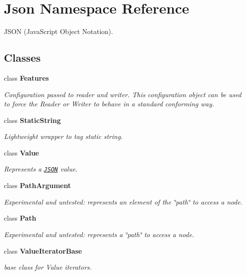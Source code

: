 \hypertarget{namespace_json}{\section{Json Namespace Reference}
\label{namespace_json}
}


J\-S\-O\-N (Java\-Script Object Notation).  


\subsection*{Classes}
\begin{DoxyCompactItemize}
\item 
class {\bfseries Features}
\begin{DoxyCompactList}\small\item\em Configuration passed to reader and writer. This configuration object can be used to force the Reader or Writer to behave in a standard conforming way. \end{DoxyCompactList}\item 
class {\bfseries Static\-String}
\begin{DoxyCompactList}\small\item\em Lightweight wrapper to tag static string. \end{DoxyCompactList}\item 
class {\bfseries Value}
\begin{DoxyCompactList}\small\item\em Represents a \href{http://www.json.org}{\tt J\-S\-O\-N} value. \end{DoxyCompactList}\item 
class {\bfseries Path\-Argument}
\begin{DoxyCompactList}\small\item\em Experimental and untested\-: represents an element of the \char`\"{}path\char`\"{} to access a node. \end{DoxyCompactList}\item 
class {\bfseries Path}
\begin{DoxyCompactList}\small\item\em Experimental and untested\-: represents a \char`\"{}path\char`\"{} to access a node. \end{DoxyCompactList}\item 
class {\bfseries Value\-Iterator\-Base}
\begin{DoxyCompactList}\small\item\em base class for Value iterators. \end{DoxyCompactList}\item 

\end{DoxyCompactItemize}
